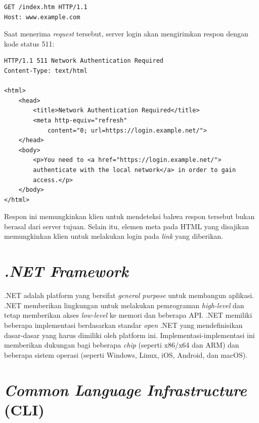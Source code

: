 \begin{verbatim}
GET /index.htm HTTP/1.1
Host: www.example.com
\end{verbatim}

Saat menerima \textit{request} tersebut, server login akan mengirimkan respon dengan kode status 511:

\begin{verbatim}
HTTP/1.1 511 Network Authentication Required
Content-Type: text/html

<html>
    <head>
        <title>Network Authentication Required</title>
        <meta http-equiv="refresh"
            content="0; url=https://login.example.net/">
    </head>
    <body>
        <p>You need to <a href="https://login.example.net/">
        authenticate with the local network</a> in order to gain
        access.</p>
    </body>
</html>
\end{verbatim}

Respon ini memungkinkan klien untuk mendeteksi bahwa respon tersebut bukan berasal dari server tujuan. Selain itu, elemen meta pada HTML yang disajikan memungkinkan klien untuk melakukan login pada \textit{link} yang diberikan.



\section{\textit{.NET Framework}}
\label{sec:net_framework}

.NET adalah platform yang bersifat \textit{general purpose} untuk membangun aplikasi\cite{NET_PRIMER:2016}. .NET memberikan lingkungan untuk melakukan pemrograman \textit{high-level} dan tetap memberikan akses \textit{low-level} ke memori dan beberapa API. .NET memiliki beberapa implementasi berdasarkan standar \textit{open} .NET yang mendefinisikan dasar-dasar yang harus dimiliki oleh platform ini. Implementasi-implementasi ini memberikan dukungan bagi beberapa \textit{chip} (seperti x86/x64 dan ARM) dan beberapa sistem operasi (seperti Windows, Linux, iOS, Android, dan macOS).



\section{\textit{Common Language Infrastructure} (CLI)}
\label{sec:cli}

